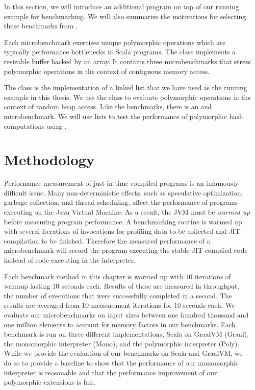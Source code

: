 In this section, we will introduce an additional program on top of our running example for benchmarking.
We will also summarize the motivations for selecting these benchmarks from \cite{scala:miniboxing}.

Each microbenchmark exercises unique polymorphic operations which are typically performance bottlenecks\cite{scala:collections-optimization}\cite{scala:dacapo} in Scala programs.
The  class implements a resizable buffer backed by an array.
It contains three microbenchmarks that stress polymorphic operations in the context of contiguous memory access.

The  class is the implementation of a linked list that we have used as the running example in this thesis.
We use the  class to evaluate polymorphic operations in the context of random heap access.
Like the  benchmarks, there is an  and  microbenchmark.
We will use lists to test the performance of polymorphic hash computations using .

\section{Methodology}

Performance measurement of just-in-time compiled programs is an infamously difficult issue\cite{java:performance-analysis}\cite{java:statistically-rigor-performance-analysis}.
Many non-deterministic effects, such as speculative optimization, garbage collection, and thread scheduling, affect the performance of programs executing on the Java Virtual Machine.
As a result, the JVM must be \textit{warmed up} before measuring program performance.
A benchmarking routine is warmed up with several iterations of invocations for profiling data to be collected and JIT compilation to be finished.
Therefore the measured performance of a microbenchmark will record the program executing the stable JIT compiled code instead of code executing in the interpreter.

Each benchmark method in this chapter is warmed up with $10$ iterations of warmup lasting $10$ seconds each.
Results of these are measured in throughput, the number of executions that were successfully completed in a second.
The results are averaged from $10$ measurement iterations for $10$ seconds each.
We evaluate our microbenchmarks on input sizes between one hundred thousand and one million elements to account for memory factors in our benchmarks. 
Each benchmark is run on three different implementations, Scala on GraalVM (Graal), the monomorphic interpreter (Mono), and the polymorphic interpreter (Poly).
While we provide the evaluation of our benchmarks on Scala and GraalVM, we do so to provide a baseline to show that the performance of our monomorphic interpreter is reasonable and that the performance improvement of our polymorphic extensions is fair.

